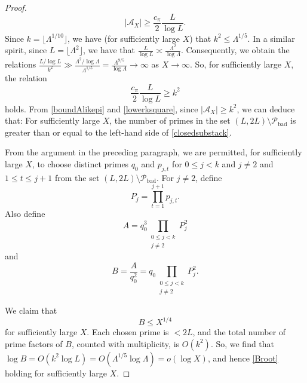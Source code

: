 \documentclass[12pt]{article}
\begin{document}
\begin{proof}
\begin{equation}
 \left| \mathcal{A}_{X} \right| \geq \frac{c_{\pi}}{2} \frac{L}{\log L}. 
\end{equation}
 Since $k = \lfloor \Lambda^{1/10} \rfloor$, we have (for sufficiently large $X$) that 
 $ k^2 \leq \Lambda^{1/5}$. 
 In a similar spirit, since 
 $L = \lfloor \Lambda^{2} \rfloor$, we have that 
 $ \frac{L}{\log L} \asymp \frac{\Lambda^2}{\log \Lambda}$. 
 Consequently, we obtain the relations
 $ \frac{L/\log L}{k^2} \gg \frac{ \Lambda^2 / \log \Lambda }{\Lambda^{1/5}} = 
 \frac{\Lambda^{9/5}}{\log \Lambda} \to \infty $
 as $X \to \infty$. 
 So, for sufficiently large $X$, the relation 
\begin{equation}\label{lowerksquare}
 \frac{c_{\pi}}{2} \frac{L}{\log L} \geq k^2 
\end{equation}
 holds. From \eqref{boundAlikepi} and \eqref{lowerksquare}, since $ |\mathcal{A}_{X}| \geq k^2$, 
 we can deduce that: For sufficiently 
 large $X$, the number of primes in the set $(L, 2L) \setminus \mathcal{P}_{\operatorname{bad}}$
 is greater than or equal to the left-hand side of \eqref{closedsubstack}. 

 From the argument in the preceding paragraph, we are permitted, for sufficiently large $X$, 
 to choose distinct primes $q_0$
 and $p_{j, t}$ for $0 \leq j < k$ and $j \neq 2$ and $1 \leq t \leq j +1$
 from the set $(L, 2L) \setminus \mathcal{P}_{\operatorname{bad}}$. 
 For $j \neq 2$, define
\begin{equation}\label{Pprodprime}
 P_j = \prod_{t=1}^{j+1} p_{j, t}. 
\end{equation}
 Also define
\begin{equation}\label{Aprodprime} 
 A = q_0^3 \prod_{\substack{ 0 \leq j < k \\ j \neq 2 }} P_{j}^2 
\end{equation}
 and 
\begin{equation}\label{Bprodprime}
 B = \frac{A}{q_0^2} = q_0 \prod_{\substack{ 0 \leq j < k \\ j \neq 2 }} P_j^2. 
\end{equation}

 We claim that 
\begin{equation}\label{Broot} 
 B \leq X^{1/4}
\end{equation}
 for sufficiently large $X$. Each chosen prime is $ < 2 L$, 
 and the total number of prime factors of $B$, counted with multiplicity, is $O(k^2)$. So, we find that 
 $ \log B = O(k^2 \log L) = O( \Lambda^{1/5} \log \Lambda ) = o(\log X)$, 
 and hence \eqref{Broot} holding for sufficiently large $X$. 


\end{proof}
\end{document}
